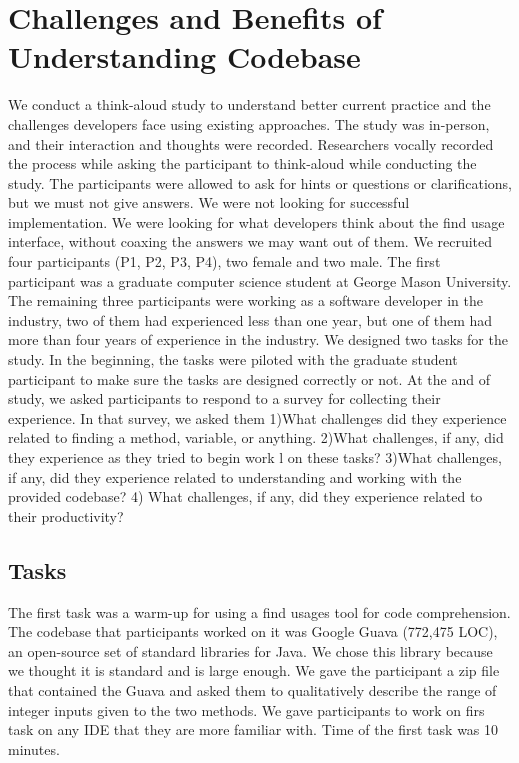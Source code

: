 \documentclass[conference]{IEEEtran}
\begin{document}
\section{Challenges and Benefits of Understanding Codebase}
We conduct a think-aloud study to understand better current practice and the challenges developers face using existing approaches. The study was in-person, and their interaction and thoughts were recorded. Researchers vocally recorded the process while asking the participant to think-aloud while conducting the study. The participants were allowed to ask for hints or questions or clarifications, but we must not give answers.
We were not looking for successful implementation. We were looking for what developers think about the find usage interface, without coaxing the answers we may want out of them.
We recruited four participants (P1, P2, P3, P4), two female and two male. The first participant was a graduate computer science student at George Mason University. The remaining three participants were working as a software developer in the industry, two of them had experienced less than one year, but one of them had more than four years of experience in the industry. We designed two tasks for the study. In the beginning, the tasks were piloted with the graduate student participant to make sure the tasks are designed correctly or not. At the and of study, we asked participants to respond to a survey for collecting their experience. In that survey, we asked them 1)What challenges did they experience related to finding a method, variable, or anything. 2)What challenges, if any, did they experience as they tried to begin work l on these tasks? 3)What challenges, if any, did they experience related to understanding and working with the provided codebase? 4) What challenges, if any, did they experience related to their productivity? 

\subsection{Tasks}
\label{tasks}

The first task was a warm-up for using a find usages tool for code comprehension. The codebase that participants worked on it was Google Guava (772,475 LOC), an open-source set of standard libraries for Java. We chose this library because we thought it is standard and is large enough. We gave the participant a zip file that contained the Guava and asked them to qualitatively describe the range of integer inputs given to the two methods. We gave participants to work on firs task on any IDE that they are more familiar with. Time of the first task was 10 minutes.\par
\end{document}

